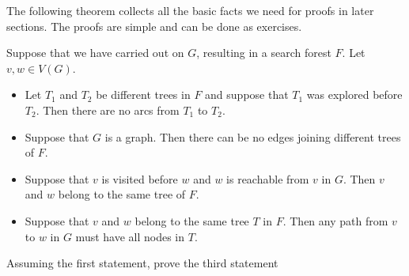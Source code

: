 The following theorem collects all the basic facts we need for proofs
in later sections. The proofs are simple and can be done as exercises. %

\begin{Theorem}
\label{thm:trav}
Suppose that we have carried out  on $G$, 
resulting in a search forest $F$. Let $v, w \in V(G)$.
\begin{itemize}
\item Let $T_1$ and $T_2$ be different trees in $F$ and suppose that $T_1$ was 
explored before $T_2$. Then there are no arcs from $T_1$ to $T_2$. 

\item Suppose that $G$ is a graph. Then there can be no edges joining different 
trees of $F$.

\item Suppose that $v$ is visited before $w$ and $w$ is reachable from $v$ in 
$G$. Then $v$ and $w$ belong to the same tree of $F$.

\item Suppose that $v$ and $w$ belong to the same tree $T$ in $F$. Then any path
 from $v$ to $w$ in $G$ must have all nodes in $T$.
\end{itemize}
\end{Theorem}


\begin{Boxample}[3]
Assuming the first statement, prove the third statement
\end{Boxample}


